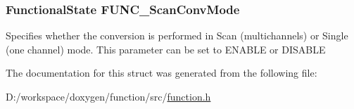 \subsubsection[{F\+U\+N\+C\+\_\+\+Scan\+Conv\+Mode}]{\setlength{\rightskip}{0pt plus 5cm}Functional\+State F\+U\+N\+C\+\_\+\+Scan\+Conv\+Mode}\label{struct_f_u_n_c___expo_type_def_a107ceb2119e7b259a591eef448594980}
Specifies whether the conversion is performed in Scan (multichannels) or Single (one channel) mode. This parameter can be set to E\+N\+A\+B\+L\+E or D\+I\+S\+A\+B\+L\+E 

The documentation for this struct was generated from the following file\+:\begin{DoxyCompactItemize}
\item 
D\+:/workspace/doxygen/function/src/\hyperlink{function_8h}{function.\+h}\end{DoxyCompactItemize}
